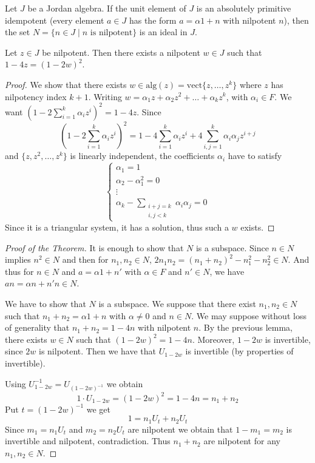 \documentclass{article}
\begin{document}
\begin{theorem}  
Let $J$ be a Jordan algebra. If the unit element of $J$ is an absolutely primitive idempotent (every element $a \in J$ has the form $a = \alpha 1 + n$ with nilpotent $n$), then the set $N = \{n \in J \mid n \text{ is nilpotent}\}$ is an ideal in $J$.  
\end{theorem}  

\begin{lemma}[McCrimmon]  
Let $z \in J$ be nilpotent. Then there exists a nilpotent $w \in J$ such that $1 - 4z = (1 - 2w)^2$.  
\end{lemma} 

\begin{proof}  
We show that there exists $w \in \mathrm{alg}(z) = \mathrm{vect}\{z, \dots, z^k\}$ where $z$ has nilpotency index $k+1$. Writing $w = \alpha_1 z + \alpha_2 z^2 + \dots + \alpha_k z^k$, with $\alpha_i \in F$. We want $(1 - 2\sum_{i=1}^k \alpha_i z^i)^2 = 1-4z$. Since  
\[ (1-2\sum_{i=1}^k \alpha_i z^i)^2 = 1 - 4\sum_{i=1}^k \alpha_i z^i + 4\sum_{i,j=1}^k \alpha_i \alpha_j z^{i+j} \]  
and $\{z, z^2, \dots, z^k\}$ is linearly independent, the coefficients $\alpha_i$ have to satisfy  
\[ \begin{cases}  
\alpha_1 = 1 \\
\alpha_2 - \alpha_1^2 = 0 \\
\vdots \\
\alpha_k - \sum_{\substack{i+j=k \\ i,j<k}} \alpha_i \alpha_j = 0  
\end{cases} \]  
Since it is a triangular system, it has a solution, thus such a $w$ exists.  
\end{proof} 

\begin{proof}[Proof of the Theorem]  
It is enough to show that $N$ is a subspace.  
Since $n \in N$ implies $n^2 \in N$ and then for $n_1, n_2 \in N$, $2n_1n_2 = (n_1+n_2)^2 - n_1^2 - n_2^2 \in N$.  
And thus for $n \in N$ and $a = \alpha 1 + n'$ with $\alpha \in F$ and $n' \in N$, we have $an = \alpha n + n'n \in N$.  

We have to show that $N$ is a subspace.  
We suppose that there exist $n_1, n_2 \in N$ such that $n_1+n_2 = \alpha 1 + n$ with $\alpha \ne 0$ and $n \in N$.  
We may suppose without loss of generality that $n_1+n_2 = 1-4n$ with nilpotent $n$.  
By the previous lemma, there exists $w \in N$ such that $(1-2w)^2 = 1-4n$. Moreover, $1-2w$ is invertible, since $2w$ is nilpotent.  
Then we have that $U_{1-2w}$ is invertible (by properties of invertible).  

Using $U_{1-2w}^{-1} = U_{(1-2w)^{-1}}$ we obtain  
\[ 1 \cdot U_{1-2w} = (1-2w)^2 = 1-4n = n_1+n_2 \]  
Put $t=(1-2w)^{-1}$ we get  
\[ 1 = n_1 U_t + n_2 U_t \]  
Since $m_1 = n_1 U_t$ and $m_2 = n_2 U_t$ are nilpotent we obtain that $1-m_1 = m_2$ is invertible and nilpotent, contradiction.  
Thus $n_1+n_2$ are nilpotent for any $n_1, n_2 \in N$. 
\end{proof}  
\end{document}
